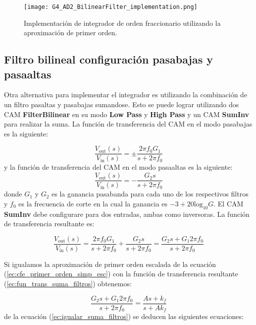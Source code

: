 \begin{figure}[!ht] 
\caption{Implementación de integrador de orden fraccionario utilizando la aproximación de primer orden.}
\label{fig:G4_AD2_BilinearFilter_implementation.png}
\centering
\texttt{[image: G4\_AD2\_BilinearFilter\_implementation.png]}
\end{figure}

	\subsection{Filtro bilineal configuración pasabajas y pasaaltas}

	Otra alternativa para implementar el integrador es utilizando la combinación de un filtro pasaltas y pasabajas sumandose. Esto se puede lograr utilizando dos CAM \textbf{FilterBilinear} en su modo \textbf{Low Pass} y \textbf{High Pass} y un CAM \textbf{SumInv} para realizar la suma. La función de transferencia del CAM en el modo pasabajas es la siguiente:
	
	\begin{equation}
		\frac{V_{\mathrm{out}} (s)}{V_{\mathrm{in}}(s)} =  \pm \frac{2 \pi f_{0} G_{1}}{s + 2 \pi f_{0}}
		\label{ec:CAM_bilinear_pasabajas}
	\end{equation}
	y la función de transferencia del CAM en el modo pasaaltas es la siguiente:
	\begin{equation}
		\frac{V_{\mathrm{out}} (s)}{V_{\mathrm{in}}(s)} =  - \frac{ G_{2} s}{s + 2 \pi f_{0}}
		\label{ec:CAM_bilinear_pasaaltas}
	\end{equation}
	donde $G_{1}$ y $G_{2}$ es la ganancia pasabanda para cada uno de los respectivos filtros y $f_{0}$ es la frecuencia de corte en la cual la ganancia es $-3 + 20 \mathrm{log}_{10}G$. El CAM \textbf{SumInv} debe configurare para dos entradas, ambas como inversoras. La función de transferencia resultante es:
	
	\begin{equation}
		\frac{V_{\mathrm{out}} (s)}{V_{\mathrm{in}}(s)} = \frac{2 \pi f_{0} G_{1}}{s + 2 \pi f_{0}} + \frac{ G_{2} s}{s + 2 \pi f_{0}} = \frac{G_{2}s + G_{1}2 \pi f_{0}}{s + 2 \pi f_{0}}
		\label{ec:fun_trans_suma_filtros}
	\end{equation}

	Si igualamos la aproximación de primer orden escalada de la ecuación (\ref{ec:cfe_primer_orden_simp_esc}) con la función de transferencia resultante (\ref{ec:fun_trans_suma_filtros}) obtenemos:
	
	\begin{equation}
		\frac{G_{2}s + G_{1}2 \pi f_{0}}{s + 2 \pi f_{0}} = \frac{As + k_{f}}{s + Ak_{f}}
		\label{ec:igualar_suma_filtros}
	\end{equation}
	de la ecuación (\ref{ec:igualar_suma_filtros}) se deducen las siguientes ecuaciones:
	
